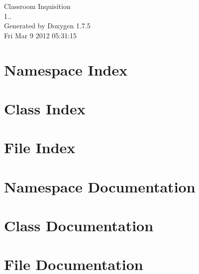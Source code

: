 \documentclass[a4paper]{book}
\begin{document}
\hypersetup{pageanchor=false,citecolor=blue}
\begin{titlepage}
\vspace*{7cm}
\begin{center}
{\Large \-Classroom \-Inquisition \\[1ex]\large 1.. }\\
\vspace*{1cm}
{\large \-Generated by Doxygen 1.7.5}\\
\vspace*{0.5cm}
{\small Fri Mar 9 2012 05:31:15}\\
\end{center}
\end{titlepage}
\clearemptydoublepage
{}
\tableofcontents
\clearemptydoublepage
{}
\hypersetup{pageanchor=true,citecolor=blue}
\chapter{\-Namespace \-Index}

\chapter{\-Class \-Index}

\chapter{\-File \-Index}

\chapter{\-Namespace \-Documentation}


\chapter{\-Class \-Documentation}






\chapter{\-File \-Documentation}
























\printindex
\end{document}
